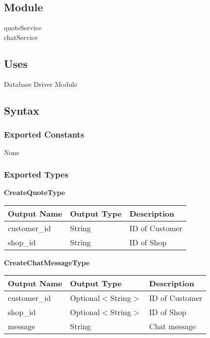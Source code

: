 \documentclass[12pt, titlepage]{article}
\begin{document}
\subsection{Module}

quoteService \\ chatService

\subsection{Uses}

Database Driver Module

\subsection{Syntax}

\subsubsection{Exported Constants}

None

\subsubsection{Exported Types}

\textbf{CreateQuoteType}

\begin{table}[H]
	\begin{tabular}{|l|l|l|}
		\hline
		\textbf{Output Name} & \textbf{Output Type} & \textbf{Description} \\
		\hline
		customer\_id         & String               & ID of Customer       \\
		\hline
		shop\_id             & String               & ID of Shop           \\
		\hline
	\end{tabular}
\end{table}

\textbf{CreateChatMessageType}

\begin{table}[H]
	\begin{tabular}{|l|l|l|}
		\hline
		\textbf{Output Name} & \textbf{Output Type} & \textbf{Description} \\
		\hline
		customer\_id         & Optional$<$String$>$ & ID of Customer       \\
		\hline
		shop\_id             & Optional$<$String$>$ & ID of Shop           \\
		\hline
		message              & String               & Chat message         \\
		\hline
	\end{tabular}
\end{table}
\end{document}
